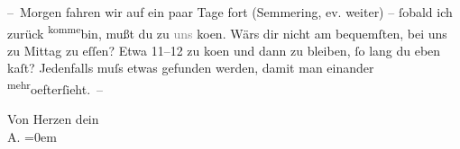 \pstart
           – Morgen fahren wir auf ein
               paar Tage fort (Semmering, {\pb}ev. weiter) –{ }ſobald
               ich zurück \substVorne{}\textsuperscript{komme}\substDazwischen{}bin\substHinten{}, mußt du zu \textcolor{gray}{uns} ko{\geminationm}en. Wärs
               dir nicht am bequemſten, bei uns zu Mittag zu eſſen? Etwa 11–12 zu ko{\geminationm}en und
               dann zu bleiben,{ }ſo lang du eben ka{\geminationn}ſt? Jedenfalls muſs
               etwas gefunden werden, damit man einander \substVorne{}\textsuperscript{mehr}\substDazwischen{}oefter\substHinten{}{ }ſieht. –\pend
           
\pstart
           Von Herzen dein{\\[\baselineskip]}\spacefill\mbox{A.}\pend
           \leftskip=0em{}\endnumbering{}  \newcommand{\dateiname}{L01551}\newcommand{\titel}{Arthur Schnitzler an Hermann Bahr, 21. 9. 1905}\newcommand{\editorInnen}{Herausgegeben von Martin Anton Müller}
